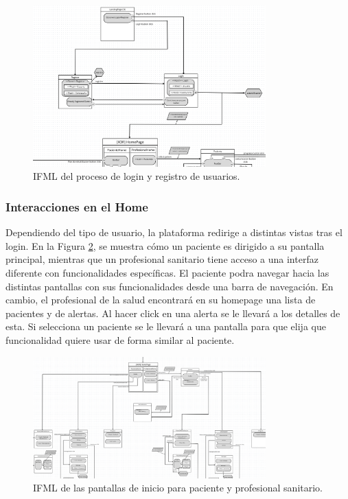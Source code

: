 \documentclass{article}
\begin{document}
\begin{figure}[H]
	\centering
	\includegraphics[width=0.8\textwidth]{images/ifml_login.png}
	\caption{IFML del proceso de login y registro de usuarios.}
	\label{fig:ifml_login}
\end{figure}

\subsubsection{Interacciones en el Home}

Dependiendo del tipo de usuario, la plataforma redirige a distintas vistas tras el login. En la Figura \ref{fig:ifml_home}, se muestra cómo un paciente es dirigido a su pantalla principal, mientras que un profesional sanitario tiene acceso a una interfaz diferente con funcionalidades específicas. El paciente podra navegar hacia las distintas pantallas con sus funcionalidades desde una barra de navegación. En cambio, el profesional de la salud encontrará en su homepage una lista de pacientes y de alertas. Al hacer click en una alerta se le llevará a los detalles de esta. Si selecciona un paciente se le llevará a una pantalla para que elija que funcionalidad quiere usar de forma similar al paciente.

\begin{figure}[H]
	\centering
	\includegraphics[width=0.8\textwidth]{images/ifml_home.png}
	\caption{IFML de las pantallas de inicio para paciente y profesional sanitario.}
	\label{fig:ifml_home}
\end{figure}
\end{document}
